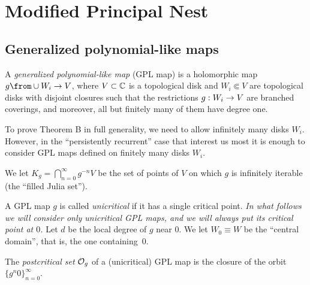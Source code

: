 \section{Modified Principal Nest}\label{principal nest}
                      

\subsection{Generalized polynomial-like maps}\label{GPL}


 A {\it generalized polynomial-like map} (GPL map) is a holomorphic map
$g\from \cup W_i \to V$, where $V \subset {\Bbb C}$ is a topological disk and 
$W_i\Subset V$ are topological disks with disjoint closures such that the restrictions
$g:W_i\rightarrow V$ are branched coverings, and moreover, all but finitely many of them have degree one.

 To prove Theorem B in full generality, we need to allow infinitely many disks
$W_i$. However, in the ``persistently recurrent'' case that interest us most
it is enough to consider GPL maps defined on finitely many disks $W_i$.
\ssk


We let $K_g  = \bigcap_{n=0}^\infty g^{-n} V$ be the set of points of $V$ on which $g$ is infinitely iterable
(the ``filled Julia set'').


%

A GPL map $g$ is called {\it unicritical} if it has a single critical point.
{\it In what follows we will consider only unicritical  GPL maps, and we will always put its critical point at $0$.} 
Let $d$ be  the local degree of $g$ near 0. We let   $W_0\equiv W$ be the ``central domain'', that is, the one
containing~0.  

The {\it postcritical set} ${\cal O}_g$ of a (unicritical) GPL map is the closure of the orbit $\{g^n 0\}_{n=0}^\infty$.


